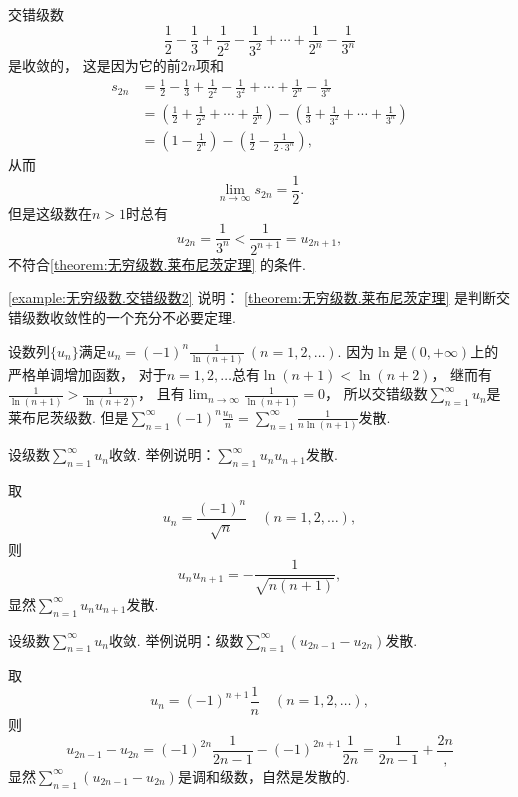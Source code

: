 \begin{example}\label{example:无穷级数.交错级数2}
交错级数\[
	\frac{1}{2} - \frac{1}{3}
	+ \frac{1}{2^2} - \frac{1}{3^2}
	+ \dotsm + \frac{1}{2^n} - \frac{1}{3^n}
\]是收敛的，
这是因为它的前\(2n\)项和\begin{align*}
	s_{2n} &= \frac{1}{2} - \frac{1}{3}
	+ \frac{1}{2^2} - \frac{1}{3^2}
	+ \dotsm + \frac{1}{2^n} - \frac{1}{3^n} \\
	&= \left(\frac{1}{2} + \frac{1}{2^2} + \dotsm + \frac{1}{2^n}\right)
	- \left(\frac{1}{3} + \frac{1}{3^2} + \dotsm + \frac{1}{3^n}\right) \\
	&= \left(1 - \frac{1}{2^n}\right)
	- \left(\frac{1}{2} - \frac{1}{2\cdot3^n}\right),
\end{align*}
从而\[
	\lim_{n\to\infty} s_{2n} = \frac{1}{2}.
\]
但是这级数在\(n>1\)时总有\[
	u_{2n} = \frac{1}{3^n} < \frac{1}{2^{n+1}} = u_{2n+1},
\]不符合\cref{theorem:无穷级数.莱布尼茨定理} 的条件.
\end{example}
\begin{remark}
\cref{example:无穷级数.交错级数2} 说明：
\cref{theorem:无穷级数.莱布尼茨定理} 是判断交错级数收敛性的一个充分不必要定理.
\end{remark}

\begin{example}
设数列\(\{u_n\}\)满足\(u_n = (-1)^n \frac1{\ln(n+1)}\ (n=1,2,\dotsc)\).
因为\(\ln\)是\((0,+\infty)\)上的严格单调增加函数，
对于\(n=1,2,\dotsc\)总有\(\ln(n+1) < \ln(n+2)\)，
继而有\(\frac1{\ln(n+1)} > \frac1{\ln(n+2)}\)，
且有\(\lim_{n\to\infty} \frac1{\ln(n+1)} = 0\)，
所以交错级数\(\sum_{n=1}^\infty u_n\)是莱布尼茨级数.
但是\(\sum_{n=1}^\infty (-1)^n \frac{u_n}{n}
= \sum_{n=1}^\infty \frac1{n \ln(n+1)}\)发散.
\end{example}

\begin{example}
设级数\(\sum_{n=1}^\infty u_n\)收敛.
举例说明：\(\sum_{n=1}^\infty u_n u_{n+1}\)发散.
\begin{solution}
取\[
	u_n = \frac{(-1)^n}{\sqrt{n}}
	\quad(n=1,2,\dotsc),
\]
则\[
	u_n u_{n+1}
	= -\frac1{\sqrt{n(n+1)}},
\]
显然\(\sum_{n=1}^\infty u_n u_{n+1}\)发散.
\end{solution}
\end{example}

\begin{example}
设级数\(\sum_{n=1}^\infty u_n\)收敛.
举例说明：级数\(\sum_{n=1}^\infty (u_{2n-1} - u_{2n})\)发散.
\begin{solution}
取\[
	u_n = (-1)^{n+1} \frac1n
	\quad(n=1,2,\dotsc),
\]
则\[
	u_{2n-1} - u_{2n}
	= (-1)^{2n} \frac1{2n-1} - (-1)^{2n+1} \frac1{2n}
	= \frac1{2n-1} + \frac{2n},
\]
显然\(\sum_{n=1}^\infty (u_{2n-1} - u_{2n})\)是调和级数，自然是发散的.
\end{solution}
\end{example}

